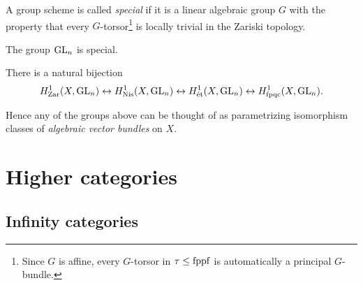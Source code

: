 \documentclass[11pt,openany]{book}
\begin{document}
\begin{definition} \cite[p.~5-11]{Grothendieck-torsion} A group scheme is called \textit{special} if it is a linear algebraic group $G$ with the property that every $G$-torsor\footnote{Since $G$ is affine, every $G$-torsor in $\tau\le \mathrm{fppf}$ is automatically a principal $G$-bundle.} is locally trivial in the Zariski topology.
\end{definition}

\begin{theorem} \cite[Th\'eor\`eme~3]{Grothendieck-torsion} The group $\mathrm{GL}_n$ is special.
\end{theorem}

\begin{corollary} \cite[11.4]{MilneLEC} There is a natural bijection
\begin{align*}
    H^1_{\mathrm{Zar}}(X,\mathrm{GL}_n) \leftrightarrow H^1_{\mathrm{Nis}}(X,\mathrm{GL}_n) \leftrightarrow H^1_{\text{\'{e}t}}(X,\mathrm{GL}_n) \leftrightarrow H^1_{\mathrm{fpqc}}(X,\mathrm{GL}_n).
\end{align*}
\end{corollary}

Hence any of the groups above can be thought of as parametrizing isomorphism classes of \textit{algebraic vector bundles} on $X$.




\chapter{Higher categories}
\minitoc

\section{Infinity categories}
\end{document}
